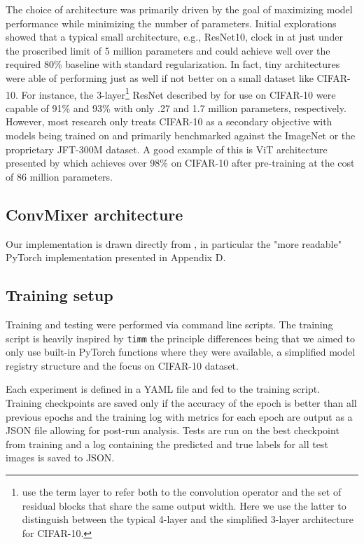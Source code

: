 \documentclass[letterpaper]{article} %
\begin{document}
The choice of architecture was primarily driven by the goal of maximizing model performance while minimizing the number of parameters. Initial explorations showed that a typical small architecture, e.g., ResNet10, clock in at just under the proscribed limit of 5 million parameters and could achieve well over the required 80\% baseline with standard regularization. In fact, tiny architectures were able of performing just as well if not better on a small dataset like CIFAR-10. For instance, the 3-layer\footnote{\citet{he2015} use the term layer to refer both to the convolution operator and the set of residual blocks that share the same output width. Here we use the latter to distinguish between the typical 4-layer and the simplified 3-layer architecture for CIFAR-10.} ResNet described by \citet{he2015} for use on CIFAR-10 were capable of 91\% and 93\% with only .27 and 1.7 million parameters, respectively. However, most research only treats CIFAR-10 as a secondary objective with models being trained on and primarily benchmarked against the ImageNet or the proprietary JFT-300M dataset. A good example of this is ViT architecture presented by \citet{Dosovitskiy2020} which achieves over 98\% on CIFAR-10 after pre-training at the cost of 86 million parameters.


\subsection{ConvMixer architecture}



Our implementation is drawn directly from \citet{trockman2022patches}, in particular the "more readable" PyTorch implementation presented in Appendix D. 

\subsection{Training setup}

Training and testing were performed via command line scripts. The training script is heavily inspired by \verb|timm| \citep{rw2019timm} the principle differences being that we aimed to only use built-in PyTorch functions where they were available, a simplified model registry structure and the focus on CIFAR-10 dataset. 

Each experiment is defined in a YAML file and fed to the training script. Training checkpoints are saved only if the accuracy of the epoch is better than all previous epochs and the training log with metrics for each epoch are output as a JSON file allowing for post-run analysis. Tests are run on the best checkpoint from training and a log containing the predicted and true labels for all test images is saved to JSON.
\end{document}
